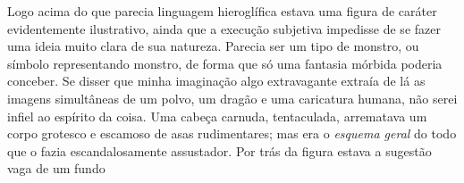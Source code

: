 \begin{Rightside}
Logo acima do que parecia linguagem hieroglífica estava uma figura de
caráter evidentemente ilustrativo, ainda que a execução subjetiva
impedisse de se fazer uma ideia muito clara de sua natureza. Parecia ser
um tipo de monstro, ou símbolo representando monstro, de forma que só
uma fantasia mórbida poderia conceber. Se disser que minha imaginação
algo extravagante extraía de lá as imagens simultâneas de um polvo, um
dragão e uma caricatura humana, não serei infiel ao espírito da coisa.
Uma cabeça carnuda, tentaculada, arrematava um corpo grotesco e escamoso
de asas rudimentares; mas era o \emph{esquema geral} do todo que o fazia
escandalosamente assustador. Por trás da figura estava a sugestão vaga
de um fundo 


\end{Rightside}

